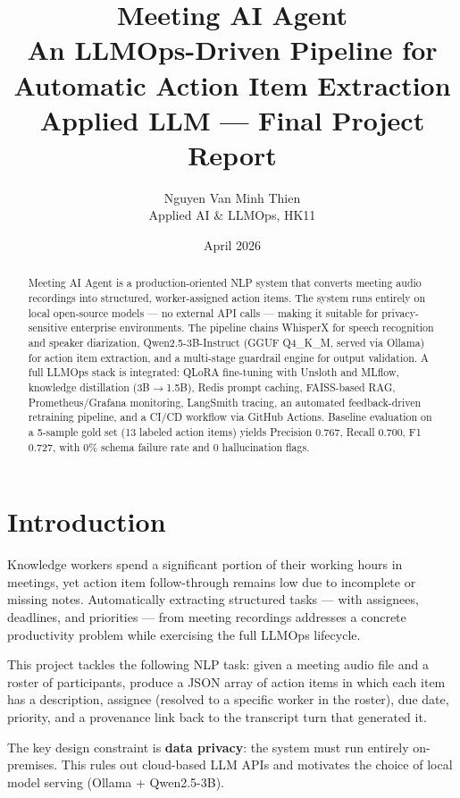 \documentclass[12pt,a4paper]{article}
\title{
    \textbf{Meeting AI Agent} \\[0.5em]
    \large An LLMOps-Driven Pipeline for Automatic Action Item Extraction \\[0.5em]
    \normalsize Applied LLM — Final Project Report
}
\author{
    Nguyen Van Minh Thien \\
    \small Applied AI \& LLMOps, HK11
}
\date{April 2026}
\begin{document}
\maketitle
\tableofcontents
\newpage

\begin{abstract}
Meeting AI Agent is a production-oriented NLP system that converts meeting audio recordings into structured, worker-assigned action items. The system runs entirely on local open-source models — no external API calls — making it suitable for privacy-sensitive enterprise environments. The pipeline chains WhisperX for speech recognition and speaker diarization, Qwen2.5-3B-Instruct (GGUF Q4\_K\_M, served via Ollama) for action item extraction, and a multi-stage guardrail engine for output validation. A full LLMOps stack is integrated: QLoRA fine-tuning with Unsloth and MLflow, knowledge distillation (3B$\rightarrow$1.5B), Redis prompt caching, FAISS-based RAG, Prometheus/Grafana monitoring, LangSmith tracing, an automated feedback-driven retraining pipeline, and a CI/CD workflow via GitHub Actions. Baseline evaluation on a 5-sample gold set (13 labeled action items) yields Precision 0.767, Recall 0.700, F1 0.727, with 0\% schema failure rate and 0 hallucination flags.
\end{abstract}

\section{Introduction}

Knowledge workers spend a significant portion of their working hours in meetings, yet action item follow-through remains low due to incomplete or missing notes. Automatically extracting structured tasks — with assignees, deadlines, and priorities — from meeting recordings addresses a concrete productivity problem while exercising the full LLMOps lifecycle.

This project tackles the following NLP task: given a meeting audio file and a roster of participants, produce a JSON array of action items in which each item has a description, assignee (resolved to a specific worker in the roster), due date, priority, and a provenance link back to the transcript turn that generated it.

The key design constraint is \textbf{data privacy}: the system must run entirely on-premises. This rules out cloud-based LLM APIs and motivates the choice of local model serving (Ollama + Qwen2.5-3B).
\end{document}

